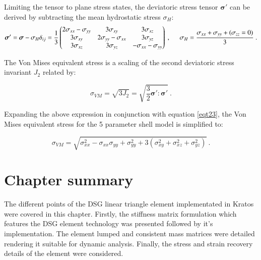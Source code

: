 Limiting the tensor to plane stress states, the deviatoric stress tensor $\boldsymbol{\sigma}'$ can be derived by subtracting the mean hydrostatic stress $\sigma_{H}$:
\begin{equation} 
\boldsymbol{\sigma}' = \boldsymbol{\sigma} - \sigma_{H} \delta_{ij} = 
\frac{1}{3}
\begin{pmatrix}
2\sigma_{xx}-\sigma_{yy} & 3\sigma_{xy} & 3\sigma_{xz} \\
3\sigma_{xy} & 2\sigma_{yy}-\sigma_{xx} & 3\sigma_{yz} \\
3\sigma_{xz} & 3\sigma_{yz} & -\sigma_{xx}-\sigma_{yy} \\
\end{pmatrix}\ ,
\hspace{5mm}
\sigma_{H} = \frac{\sigma_{xx} + \sigma_{yy} + (\sigma_{zz} = 0)}{3}
\label{eqt23}\ .
\end{equation}

The Von Mises equivalent stress is a scaling of the second deviatoric stress invariant $J_2$ related by:

\begin{equation} 
\sigma_{VM} = \sqrt{3J_2} = \sqrt{\frac{3}{2}\boldsymbol{\sigma}' : \boldsymbol{\sigma}'}
\label{eqt24}\ .
\end{equation}

Expanding the above expression in conjunction with equation \ref{eqt23}, the Von Mises equivalent stress for the 5 parameter shell model is simplified to:

\begin{equation} 
\sigma_{VM} = 
\sqrt{
\sigma_{xx}^2
- \sigma_{xx}\sigma_{yy}
+ \sigma_{yy}^2
+ 3(\sigma_{xy}^2 + \sigma_{xz}^2 + \sigma_{yz}^2)
}
\label{eqt25}\ .
\end{equation}

\section{Chapter summary}
The different points of the DSG linear triangle element implementated in Kratos were covered in this chapter. Firstly, the stiffness matrix formulation which features the DSG element technology was presented followed by it's implementation. The element lumped and consistent mass matrices were detailed rendering it suitable for dynamic analysis. Finally, the stress and strain recovery details of the element were considered.